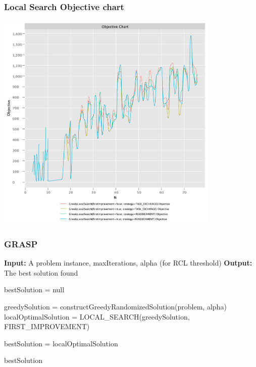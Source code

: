 \documentclass{beamer}
\begin{document}
\begin{frame}
\frametitle{Local Search Objective chart}
\includegraphics[width=0.8\textwidth]{./documentation/assets/new.localSearchParams.objectiveChart.pdf}
\end{frame}

\begin{frame}[fragile] 
\frametitle{GRASP}
\begin{algorithm}
\begin{algorithmic}
    \State \textbf{Input:} A problem instance, maxIterations, alpha (for RCL threshold)
    \State \textbf{Output:} The best solution found

    \State bestSolution = null

        \State greedySolution = constructGreedyRandomizedSolution(problem, alpha)
        \State localOptimalSolution = LOCAL\_SEARCH(greedySolution, FIRST\_IMPROVEMENT)

            \State bestSolution = localOptimalSolution
        \EndIf
    \EndFor

    \State \Return bestSolution
\end{algorithmic}
\end{algorithm}
\end{frame}
\end{document}
